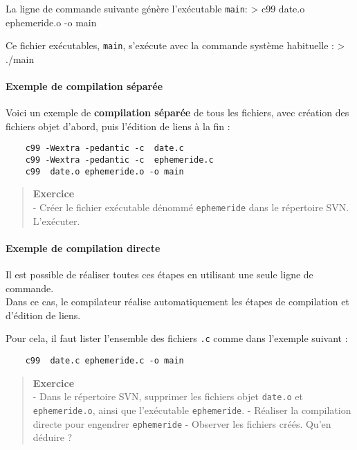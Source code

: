 \documentclass[11pt]{article}
\begin{document}
La ligne de commande suivante génère l'exécutable \texttt{main}:
\textgreater{} c99 date.o ephemeride.o -o main

Ce fichier exécutables, \texttt{main}, s'exécute avec la commande
système habituelle : \textgreater{} ./main

\paragraph{Exemple de compilation
séparée}\label{exemple-de-compilation-suxe9paruxe9e}

Voici un exemple de \textbf{compilation séparée} de tous les fichiers,
avec création des fichiers objet d'abord, puis l'édition de liens à la
fin :

\begin{verbatim}
    c99 -Wextra -pedantic -c  date.c 
    c99 -Wextra -pedantic -c  ephemeride.c
    c99  date.o ephemeride.o -o main 
\end{verbatim}

\begin{quote}
\textbf{Exercice}\\
- Créer le fichier exécutable dénommé \texttt{ephemeride} dans le
répertoire SVN. L'exécuter.
\end{quote}

\paragraph{Exemple de compilation
directe}\label{exemple-de-compilation-directe}

Il est possible de réaliser toutes ces étapes en utilisant une seule
ligne de commande.\\
Dans ce cas, le compilateur réalise automatiquement les étapes de
compilation et d'édition de liens.

Pour cela, il faut lister l'ensemble des fichiers \texttt{.c} comme dans
l'exemple suivant :

\begin{verbatim}
    c99  date.c ephemeride.c -o main 
\end{verbatim}

\begin{quote}
\textbf{Exercice}\\
- Dans le répertoire SVN, supprimer les fichiers objet \texttt{date.o}
et \texttt{ephemeride.o}, ainsi que l'exécutable \texttt{ephemeride}. -
Réaliser la compilation directe pour engendrer \texttt{ephemeride} -
Observer les fichiers créés. Qu'en déduire ?
\end{quote}
\end{document}
